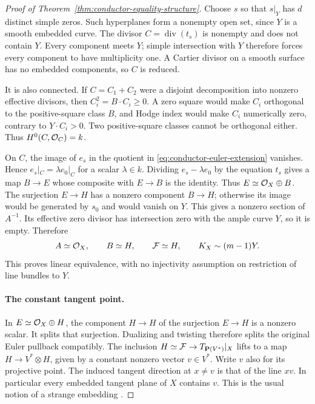 \begin{proof}[Proof of Theorem~\ref{thm:conductor-equality-structure}]
Choose $s$ so that $s|_Y$ has $d$ distinct simple zeros. Such
hyperplanes form a nonempty open set, since $Y$ is a smooth
embedded curve. The divisor $C=\operatorname{div}(t_s)$ is
nonempty and does not contain $Y$. Every component meets $Y$;
simple intersection with $Y$ therefore forces every component to
have multiplicity one. A Cartier divisor on a smooth surface has
no embedded components, so $C$ is reduced.

It is also connected. If $C=C_1+C_2$ were a disjoint decomposition
into nonzero effective divisors, then
$C_i^2=B\cdot C_i\geq0$. A zero square would make $C_i$
orthogonal to the positive-square class $B$, and Hodge index
would make $C_i$ numerically zero, contrary to $Y\cdot C_i>0$.
Two positive-square classes cannot be orthogonal either.
Thus $H^0(C,\mathcal O_C)=k$.

On $C$, the image of $e_s$ in the quotient in
\eqref{eq:conductor-euler-extension} vanishes. Hence
$e_s|_C=\lambda e_0|_C$ for a scalar $\lambda\in k$.
Dividing $e_s-\lambda e_0$ by the equation $t_s$ gives a map
$B\to E$ whose composite with $E\to B$ is the identity.
Thus $E\simeq\mathcal O_X\oplus B$.
The surjection $E\to H$ has a nonzero component $B\to H$;
otherwise its image would be generated by $s_0$ and would vanish
on $Y$. This gives a nonzero section of $A^{-1}$.
Its effective zero divisor has intersection zero with the ample
curve $Y$, so it is empty. Therefore
\begin{equation}\label{eq:conductor-linear-canonical}
 A\simeq\mathcal O_X,\qquad B\simeq H,\qquad
 \mathcal F\simeq H,\qquad K_X\sim(m-1)Y.
\end{equation}
This proves linear equivalence, with no injectivity assumption on
restriction of line bundles to $Y$.

\paragraph{The constant tangent point.}
In $E\simeq\mathcal O_X\oplus H$, the component $H\to H$ of the
surjection $E\to H$ is a nonzero scalar. It splits that surjection.
Dualizing and twisting therefore splits the original Euler pullback
compatibly. The inclusion $H\simeq\mathcal F\to T_{\mathbf P(V^*)}|_X$
lifts to a map $H\to V^*\otimes H$, given by a constant nonzero
vector $v\in V^*$. Write $v$ also for its projective point.
The induced tangent direction at $x\ne v$ is that of the line
$xv$. In particular every embedded tangent plane of $X$ contains
$v$. This is the usual notion of a strange embedding
\cite[\S2.1 and Proposition~2.5, author pp.~2--5]{FurukawaStrange}.


\end{proof}
